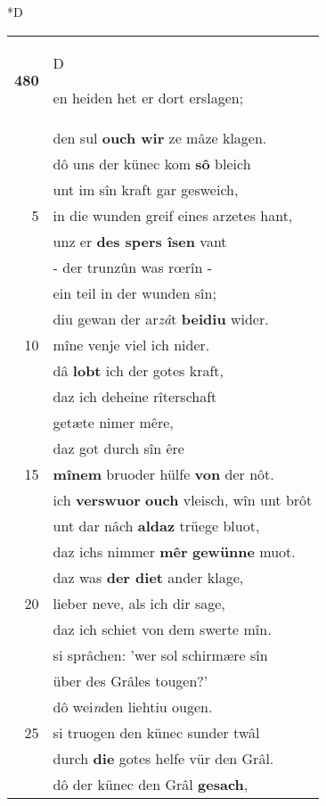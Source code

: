 \documentclass[8pt,a4paper,notitlepage]{article}
\begin{document}
\begin{table}[ht]
\begin{minipage}[t]{0.5\linewidth}
\small
\begin{center}*D
\end{center}
\begin{tabular}{rl}
\textbf{480} & \begin{large}D\end{large}en heiden het er dort erslagen;\\ 
 & den sul \textbf{ouch wir} ze mâze klagen.\\ 
 & dô uns der künec kom \textbf{sô} bleich\\ 
 & unt im sîn kraft gar gesweich,\\ 
5 & in die wunden greif eines arzetes hant,\\ 
 & unz er \textbf{des spers îsen} vant\\ 
 & - der trunzûn was rœrîn -\\ 
 & ein teil in der wunden sîn;\\ 
 & diu gewan der ar\textit{zâ}t \textbf{beidiu} wider.\\ 
10 & mîne venje viel ich nider.\\ 
 & dâ \textbf{lobt} ich der gotes kraft,\\ 
 & daz ich deheine rîterschaft\\ 
 & getæte nimer mêre,\\ 
 & daz got durch sîn êre\\ 
15 & \textbf{mînem} bruoder hülfe \textbf{von} der nôt.\\ 
 & ich \textbf{verswuor} \textbf{ouch} vleisch, wîn unt brôt\\ 
 & unt dar nâch \textbf{aldaz} trüege bluot,\\ 
 & daz ichs nimmer \textbf{mêr} \textbf{gewünne} muot.\\ 
 & daz was \textbf{der diet} ander klage,\\ 
20 & lieber neve, als ich dir sage,\\ 
 & daz ich schiet von dem swerte mîn.\\ 
 & si sprâchen: 'wer sol schirmære sîn\\ 
 & über des Grâles tougen?'\\ 
 & dô wei\textit{n}den liehtiu ougen.\\ 
25 & si truogen den künec sunder twâl\\ 
 & durch \textbf{die} gotes helfe vür den Grâl.\\ 
 & dô der künec den Grâl \textbf{gesach},\\ 

\end{tabular}
\end{minipage}
\end{table}
\end{document}
